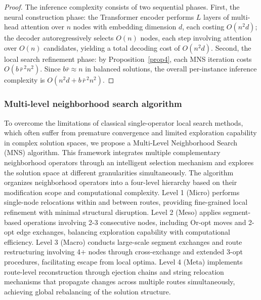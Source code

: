 \documentclass[preprint,12pt,authoryear]{elsarticle}
\theoremstyle{definition}
\begin{document}
\begin{proof}
The inference complexity consists of two sequential phases.
First, the neural construction phase: the Transformer encoder performs $L$ layers of multi-head attention over $n$ nodes with embedding dimension $d$, each costing $O(n^2 d)$; the decoder autoregressively selects $O(n)$ nodes, each step involving attention over $O(n)$ candidates, yielding a total decoding cost of $O(n^2 d)$.
Second, the local search refinement phase: by Proposition~\ref{prop4}, each MNS iteration costs
$O\!\left(b\,\bar{r}^{\,2} n^{2}\right).$
Since $b\bar{r} \approx n$ in balanced solutions, the overall per-instance inference complexity is
$O\!\left(n^{2} d + b\,\bar{r}^{\,2} n^{2}\right).$
\end{proof}

\subsubsection{Multi-level neighborhood search algorithm}

To overcome the limitations of classical single-operator local search methods, which often suffer from premature convergence and limited exploration capability in complex solution spaces, we propose a Multi-Level Neighborhood Search (MNS) algorithm. 
This framework integrates multiple complementary neighborhood operators through an intelligent selection mechanism and explores the solution space at different granularities simultaneously. 
The algorithm organizes neighborhood operators into a four-level hierarchy based on their modification scope and computational complexity. 
Level 1 (Micro) performs single-node relocations within and between routes, providing fine-grained local refinement with minimal structural disruption. 
Level 2 (Meso) applies segment-based operations involving 2-3 consecutive nodes, including Or-opt moves and 2-opt edge exchanges, balancing exploration capability with computational efficiency. 
Level 3 (Macro) conducts large-scale segment exchanges and route restructuring involving 4$+$ nodes through cross-exchange and extended 3-opt procedures, facilitating escape from local optima. 
Level 4 (Meta) implements route-level reconstruction through ejection chains and string relocation mechanisms that propagate changes across multiple routes simultaneously, achieving global rebalancing of the solution structure.
\end{document}
